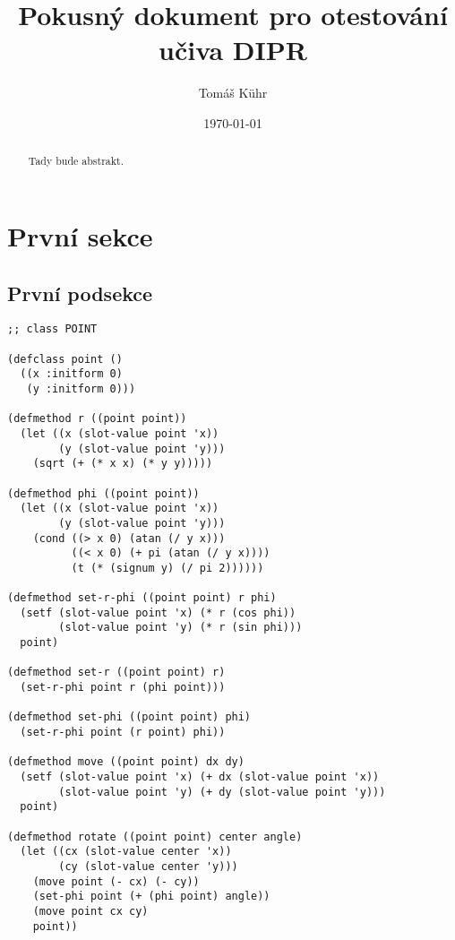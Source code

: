 \documentclass{article}
\title{Pokusný dokument pro otestování učiva DIPR}
\author{Tomáš Kühr}
\date{\today}
\theoremstyle{plain}
\begin{document}
\maketitle

\begin{abstract}
Tady bude abstrakt. \blindtext
\end{abstract}

\newpage
\tableofcontents
\newpage
\listoffigures
\listoftables
\lstlistoflistings
\newpage
\section{První sekce}\label{sec:First}

\blindtext[10]

\subsection{První podsekce}\label{subsec:Fristfirst}

\blindtext[2]

\begin{lstlisting}[language=LISP,float=t,caption={Kód třídy point}, label={lst:point}]
;; class POINT

(defclass point ()
  ((x :initform 0)
   (y :initform 0)))

(defmethod r ((point point))
  (let ((x (slot-value point 'x))
        (y (slot-value point 'y)))
    (sqrt (+ (* x x) (* y y)))))

(defmethod phi ((point point))
  (let ((x (slot-value point 'x))
        (y (slot-value point 'y)))
    (cond ((> x 0) (atan (/ y x)))
          ((< x 0) (+ pi (atan (/ y x))))
          (t (* (signum y) (/ pi 2))))))

(defmethod set-r-phi ((point point) r phi)
  (setf (slot-value point 'x) (* r (cos phi))
        (slot-value point 'y) (* r (sin phi)))
  point)

(defmethod set-r ((point point) r)
  (set-r-phi point r (phi point)))

(defmethod set-phi ((point point) phi)
  (set-r-phi point (r point) phi))

(defmethod move ((point point) dx dy)
  (setf (slot-value point 'x) (+ dx (slot-value point 'x))
        (slot-value point 'y) (+ dy (slot-value point 'y)))
  point)

(defmethod rotate ((point point) center angle)
  (let ((cx (slot-value center 'x))
        (cy (slot-value center 'y)))
    (move point (- cx) (- cy))
    (set-phi point (+ (phi point) angle))
    (move point cx cy)
    point))
\end{lstlisting}
\end{document}
